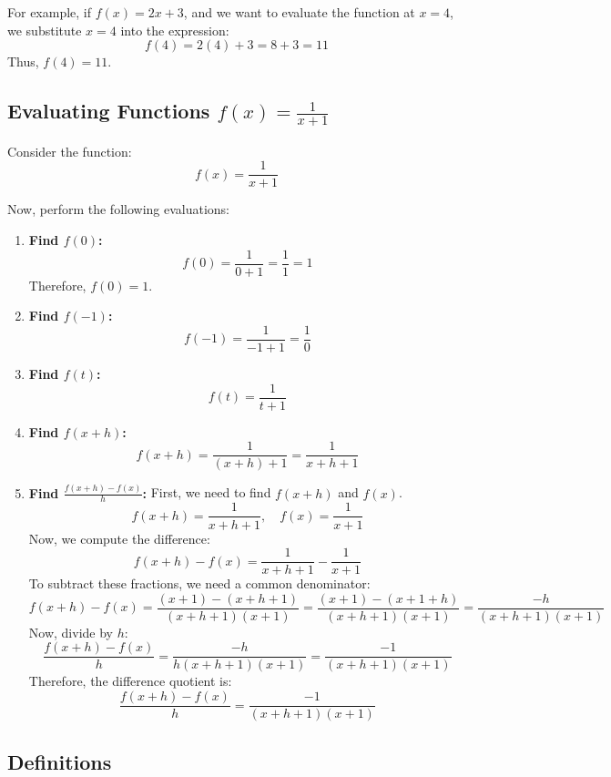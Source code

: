 For example, if \( f(x) = 2x + 3 \), and we want to evaluate the function at \( x = 4 \), we substitute \( x = 4 \) into the expression:
\[
f(4) = 2(4) + 3 = 8 + 3 = 11
\]
Thus, \( f(4) = 11 \).


\subsection*{Evaluating Functions \( f(x) = \frac{1}{x+1} \)}

Consider the function:
\[
f(x) = \frac{1}{x+1}
\]

Now, perform the following evaluations:

\begin{enumerate}
    \item \textbf{Find \( f(0) \):}
    \[
    f(0) = \frac{1}{0 + 1} = \frac{1}{1} = 1
    \]
    Therefore, \( f(0) = 1 \).
    
    \item \textbf{Find \( f(-1) \):}
    \[
    f(-1) = \frac{1}{-1 + 1} = \frac{1}{0}
    \]

    \item \textbf{Find \( f(t) \):}
    \[
    f(t) = \frac{1}{t + 1}
    \]

    \item \textbf{Find \( f(x + h) \):}
    \[
    f(x + h) = \frac{1}{(x + h) + 1} = \frac{1}{x + h + 1}
    \]

    \item \textbf{Find \( \frac{f(x + h) - f(x)}{h} \):}
    First, we need to find \( f(x + h) \) and \( f(x) \).
    \[
    f(x + h) = \frac{1}{x + h + 1}, \quad f(x) = \frac{1}{x + 1}
    \]
    Now, we compute the difference:
    \[
    f(x + h) - f(x) = \frac{1}{x + h + 1} - \frac{1}{x + 1}
    \]
    To subtract these fractions, we need a common denominator:
    \[
    f(x + h) - f(x) = \frac{(x + 1) - (x + h + 1)}{(x + h + 1)(x + 1)} = \frac{(x + 1) - (x + 1 + h)}{(x + h + 1)(x + 1)} = \frac{-h}{(x + h + 1)(x + 1)}
    \]
    Now, divide by \( h \):
    \[
    \frac{f(x + h) - f(x)}{h} = \frac{-h}{h(x + h + 1)(x + 1)} = \frac{-1}{(x + h + 1)(x + 1)}
    \]
    Therefore, the difference quotient is:
    \[
    \frac{f(x + h) - f(x)}{h} = \frac{-1}{(x + h + 1)(x + 1)}
    \]
\end{enumerate}

\subsection{Definitions}

